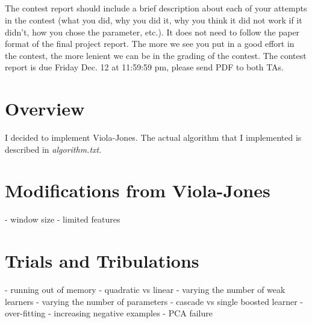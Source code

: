 \documentclass[letterpaper,12pt]{article}
\title{\className \\ \assignmentName}
\author{\myName}
\date{\dueDate}
\begin{document}
\maketitle

The contest report should include a brief description about each of your attempts in the contest (what you did, why you did it, why you think it did not work if it didn't, how you chose the parameter, etc.). It does not need to follow the paper format of the final project report. The more we see you put in a good effort in the contest, the more lenient we can be in the grading of the contest. The contest report is due  Friday Dec. 12 at 11:59:59 pm, please send PDF to both TAs.

\section{Overview}
I decided to implement Viola-Jones. The actual algorithm that I implemented is described in \textit{algorithm.txt}.

\section{Modifications from Viola-Jones}
- window size
- limited features

\section{Trials and Tribulations}

- running out of memory
- quadratic vs linear
- varying the number of weak learners
- varying the number of parameters
- cascade vs single boosted learner
- over-fitting
- increasing negative examples
- PCA failure
\end{document}
